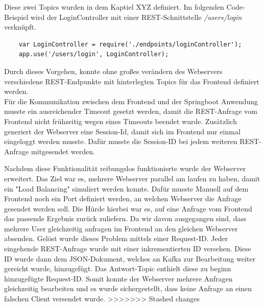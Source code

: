 Diese zwei Topics wurden in dem Kaptiel XYZ definiert. Im folgenden Code-Beispiel wird der LoginController mit einer REST-Schnittstelle \textit{/users/login} verknüpft. \\

\begin{lstlisting}
	var LoginController = require('./endpoints/loginController');
	app.use('/users/login', LoginController);
\end{lstlisting}

Durch dieses Vorgehen, konnte ohne großes verändern des Webservers verschiedene REST-Endpunkte mit hinterlegten Topics für das Frontend definiert werden. \\

Für die Kommunikation zwischen dem Frontend und der Springboot Anwendung musste ein ausreichender Timeout gesetzt werden, damit die REST-Anfrage vom Frontend nicht frühzeitig wegen eines Timeouts beendet wurde.
Zusätzlich generiert der Webserver eine Session-Id, damit sich im Frontend nur einmal eingeloggt werden musste. Dafür musste die Session-ID bei jedem weiteren REST-Anfrage mitgesendet werden. 


Nachdem diese Funktionalität reibungslos funktionierte wurde der Webserver erweitert. Das Ziel war es, mehrere Webserver parallel am laufen zu haben, damit ein "Load Balancing" simuliert werden konnte. Dafür musste Manuell auf dem Frontend noch ein Port definiert werden, an welchen Webserver die Anfrage gesendet werden soll. Die Hürde hierbei war es, auf eine Anfrage vom Frontend das passende Ergebnis zurück zuliefern. Da wir davon ausgegangen sind, dass mehrere User gleichzeitig anfragen im Frontend an den gleichen Webserver absenden. Gelöst wurde dieses Problem mittels einer Request-ID. Jeder eingehende REST-Anfrage wurde mit einer inkrementierten ID versehen. Diese ID wurde dann dem JSON-Dokument, welches an Kafka zur Bearbeitung weiter gereicht wurde, hinzugefügt. Das Antwort-Topic enthielt diese zu beginn hinzugefügte Request-ID. Somit konnte der Webserver mehrere Anfragen gleichzeitig bearbeiten und es wurde sichergestellt, dass keine Anfrage an einen falschen Client versendet wurde.
>>>>>>> Stashed changes

